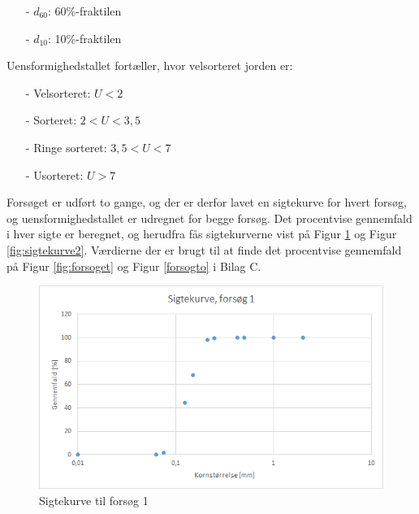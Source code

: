 \begin{itemize}
	\item[-] $d_{60}$: 60\%-fraktilen
	\item[-] $d_{10}$: 10\%-fraktilen
\end{itemize}

Uensformighedstallet fortæller, hvor velsorteret jorden er:
\begin{itemize}
	\item[-] Velsorteret: $U < 2$
	\item[-] Sorteret: $2 < U < 3,\!5$
	\item[-] Ringe sorteret: $3,\!5 < U < 7$
	\item[-] Usorteret: $U > 7$
\end{itemize}

Forsøget er udført to gange, og der er derfor lavet en sigtekurve for hvert forsøg, og uensformighedstallet er udregnet for begge forsøg. 
\newline \indent{     }  Det procentvise gennemfald i hver sigte er beregnet, og herudfra fås sigtekurverne vist på Figur \ref{fig:sigtekurve1} og Figur \ref{fig:sigtekurve2}. Værdierne der er brugt til at finde det procentvise gennemfald på Figur \ref{fig:forsoget} og Figur \ref{forsogto} i Bilag C. 

\begin{figure}[htbp]
		\includegraphics[width=1.0\textwidth]{billeder/sigtekurve1.png}
		\caption{Sigtekurve til forsøg 1}
		\label{fig:sigtekurve1}
\end{figure}

